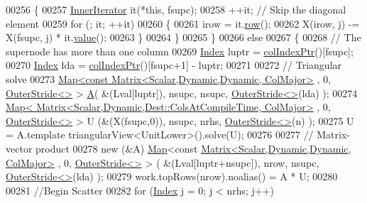 \begin{DoxyCode}
00256         \{
00257           \hyperlink{class_eigen_1_1_inner_iterator}{InnerIterator} it(*\textcolor{keyword}{this}, fsupc);
00258           ++it; \textcolor{comment}{// Skip the diagonal element}
00259           \textcolor{keywordflow}{for} (; it; ++it)
00260           \{
00261             irow = it.\hyperlink{class_eigen_1_1_inner_iterator_a3ab6f3afdf62740623cdc9ecb14dc132}{row}();
00262             X(irow, j) -= X(fsupc, j) * it.\hyperlink{class_eigen_1_1_inner_iterator_ab04bccb41eb22ffcb92dc61125aab119}{value}();
00263           \}
00264         \}
00265       \}
00266       \textcolor{keywordflow}{else}
00267       \{
00268         \textcolor{comment}{// The supernode has more than one column }
00269         \hyperlink{namespace_eigen_a62e77e0933482dafde8fe197d9a2cfde}{Index} luptr = \hyperlink{group___sparse_l_u___module_a87c0272aedd8ee01d4245bd719738b5d}{colIndexPtr}()[fsupc]; 
00270         \hyperlink{namespace_eigen_a62e77e0933482dafde8fe197d9a2cfde}{Index} lda = \hyperlink{group___sparse_l_u___module_a87c0272aedd8ee01d4245bd719738b5d}{colIndexPtr}()[fsupc+1] - luptr;
00271         
00272         \textcolor{comment}{// Triangular solve }
00273         \hyperlink{group___core___module_class_eigen_1_1_map}{Map<const Matrix<Scalar,Dynamic,Dynamic, ColMajor>}
      , 0, \hyperlink{class_eigen_1_1_outer_stride}{OuterStride<>} > \hyperlink{group___core___module_class_eigen_1_1_matrix}{A}( &(Lval[luptr]), nsupc, nsupc, \hyperlink{class_eigen_1_1_outer_stride}{OuterStride<>}(lda) );
00274         \hyperlink{group___core___module_class_eigen_1_1_map}{Map< Matrix<Scalar,Dynamic,Dest::ColsAtCompileTime, ColMajor>}
      , 0, \hyperlink{class_eigen_1_1_outer_stride}{OuterStride<>} > U (&(X(fsupc,0)), nsupc, nrhs, \hyperlink{class_eigen_1_1_outer_stride}{OuterStride<>}(n) );
00275         U = A.template triangularView<UnitLower>().solve(U); 
00276         
00277         \textcolor{comment}{// Matrix-vector product }
00278         \textcolor{keyword}{new} (&A) \hyperlink{group___core___module_class_eigen_1_1_map}{Map}<\textcolor{keyword}{const} \hyperlink{group___core___module_class_eigen_1_1_matrix}{Matrix<Scalar,Dynamic,Dynamic, ColMajor>}
      , 0, \hyperlink{class_eigen_1_1_outer_stride}{OuterStride<>} > ( &(Lval[luptr+nsupc]), nrow, nsupc, 
      \hyperlink{class_eigen_1_1_outer_stride}{OuterStride<>}(lda) );
00279         work.topRows(nrow).noalias() = A * U;
00280         
00281         \textcolor{comment}{//Begin Scatter }
00282         \textcolor{keywordflow}{for} (\hyperlink{namespace_eigen_a62e77e0933482dafde8fe197d9a2cfde}{Index} j = 0; j < nrhs; j++)

\end{DoxyCode}
